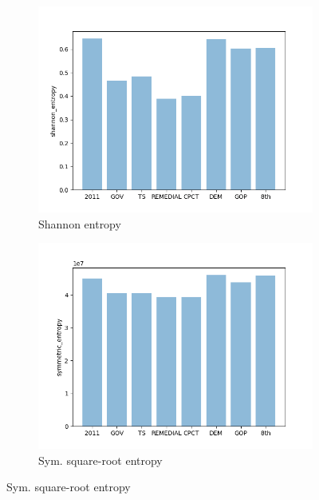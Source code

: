 \documentclass{mgggarticle}
\begin{document}
\begin{figure}
\begin{subfigure}{0.4\textwidth}
\centering
\includegraphics[width=\textwidth]{bars/shannon_entropy_bar.png}
\caption{Shannon entropy}
\end{subfigure}
\begin{subfigure}{0.4\textwidth}
\centering
\includegraphics[width=\textwidth]{bars/symmetric_entropy_bar.png}
\caption{Sym. square-root entropy}
\end{subfigure}


\end{figure}
\end{document}
